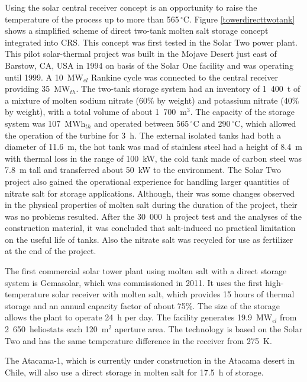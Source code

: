 Using the solar central receiver concept is an opportunity to raise the temperature of the process up to more than 565$\,^{\circ}\mathrm{C}$. Figure \ref{towerdirecttwotank}  shows a simplified scheme of direct two-tank molten salt storage concept integrated into CRS. This concept was first tested in the Solar Two power plant. This pilot solar-thermal project was built in the Mojave Desert just east of Barstow, CA, USA in 1994 on basis of the Solar One facility and was operating until 1999. A 10~MW$_{el}$ Rankine cycle was connected to the central receiver providing 35~MW$_{th}$. The two-tank storage system had an inventory of 1~400~t of a mixture of molten sodium nitrate (60\% by weight) and potassium nitrate (40\% by weight), with a total volume of about 1~700~m$^3$. The capacity of the storage system was 107~MWh$_{th}$ and operated between 565$\,^{\circ}\mathrm{C}$ and 290$\,^{\circ}\mathrm{C}$, which allowed the operation of the turbine for 3~h. The external isolated tanks had both a diameter of 11.6~m, the hot tank was mad of stainless steel had a height of 8.4~m with thermal loss in the range of 100~kW, the cold tank made of carbon steel was 7.8~m tall and transferred about 50~kW to the environment. The Solar Two project also gained the operational experience for handling larger quantities of nitrate salt for storage applications. Although, their was some changes observed in the physical properties of molten salt during the duration of the project, their was no problems resulted. After the 30~000~h project test and the analyses of the construction material, it was concluded that salt-induced no practical limitation on the useful life of tanks. Also the nitrate salt was recycled for use as fertilizer at the end of the project. \cite{Steinmann2015} 

The first commercial solar tower plant using molten salt with a direct storage system is Gemasolar, which was commissioned in 2011. It uses the first high-temperature solar receiver with molten salt, which provides 15 hours of thermal storage and an annual capacity factor of about 75\%. The size of the storage allows the plant to operate 24~h per day. The facility generates 19.9~MW$_{el}$ from 2~650~heliostats each 120~m$^2$ aperture area. The technology is based on the Solar Two and has the same temperature difference in the receiver from 275~K. \cite{NREL2011}

The Atacama-1, which is currently under construction in the Atacama desert in Chile, will also use a direct storage in molten salt for 17.5~h of storage. \cite{NREL2015b,AbengoaSolar2015a,AbengoaSolar2015}

